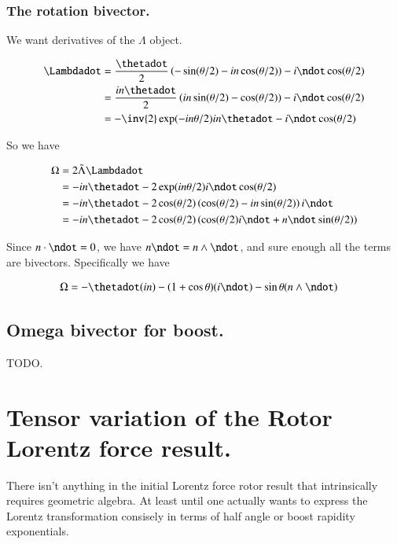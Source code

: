 \documentclass{article}
\newcommand{\reverse}[1]{\tilde{{#1}}}
\begin{document}
\subsubsection{ The rotation bivector. }

We want derivatives of the $\Lambda$ object.

\begin{align*}
\Lambdadot 
&= \frac{\thetadot}{2} \left( -\sin( \theta/ 2 ) - i n \cos( \theta/ 2 ) \right) - i \ndot \cos(\theta/2) \\
&= \frac{i n \thetadot}{2} \left( i n \sin( \theta/ 2 ) - \cos( \theta/ 2 ) \right) - i \ndot \cos(\theta/2) \\
&= -\inv{2} \exp( -i n \theta/2 ) {i n \thetadot} - i \ndot \cos(\theta/2) \\
\end{align*}

So we have

\begin{align*}
\Omega 
&= 2 \reverse{\Lambda} \Lambdadot \\
&= -{i n \thetadot} - 2 \exp(i n \theta/2) i \ndot \cos(\theta/2) \\
&= -{i n \thetadot} - 2 \cos(\theta/2) \left( \cos(\theta/2) - i n \sin(\theta/2)  \right) i \ndot \\
&= -{i n \thetadot} - 2 \cos(\theta/2) \left( \cos(\theta/2) i \ndot + n \ndot \sin(\theta/2)  \right) \\
\end{align*}

Since $n \cdot \ndot = 0$, we have $n \ndot = n \wedge \ndot$, and sure enough all the terms are bivectors.  Specifically
we have

\begin{align*}
\Omega 
&= -\thetadot(i n) - (1 + \cos\theta ) (i \ndot) - \sin\theta (n \wedge \ndot)
\end{align*}

\subsection{ Omega bivector for boost. }

TODO.

\section{ Tensor variation of the Rotor Lorentz force result. }

There isn't anything in the initial Lorentz force rotor result that intrinsically requires geometric algebra.  At least until
one actually
wants to express the Lorentz transformation consisely in terms of half angle or boost rapidity exponentials.
\end{document}
